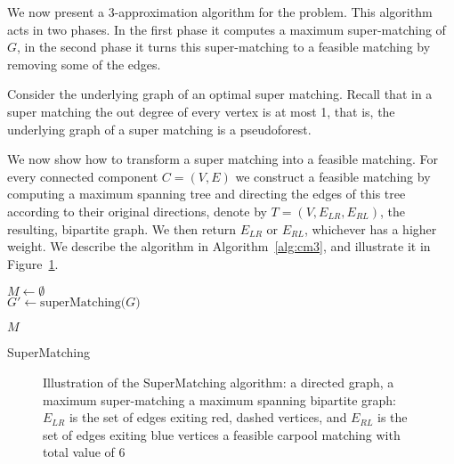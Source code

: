 \label{sub:cm}
We now present a 3-app\-roximation algorithm for the \textsc{\CARPOOL{}} problem.
This algorithm acts in two phases.
In the first phase it computes a maximum super-matching of $G$, 
in the second phase it turns this super-matching to a feasible matching
by removing some of the edges.

Consider the underlying graph of an optimal super matching.
Recall that in a super matching the out degree of every vertex is at most 1,
that is, the underlying graph of a super matching is a pseudoforest.

We now show how to transform a super matching into a feasible matching.
For every connected component $C = (V, E)$ we construct a feasible matching by
computing a maximum spanning tree and directing the edges of this tree according
to their original directions, denote by $T = (V, E_{LR}, E_{RL})$, the resulting, 
bipartite graph.
We then return $E_{LR}$ or $E_{RL}$,
whichever has a higher weight. 
We describe the algorithm in Algorithm~\ref{alg:cm3}, and illustrate it in Figure~\ref{fig:spanning-bipartite-graph}.   

\begin{algorithm}

$M \leftarrow \emptyset$								\\
$G' \leftarrow \text{superMatching($G$)}$				\\


\Return $M$
\caption{
\label{alg:cm3}
SuperMatching}
\end{algorithm}

\begin{figure}
\centering

\caption[]{
\label{fig:spanning-bipartite-graph}
Illustration of the SuperMatching algorithm:
 a directed graph, 
 a maximum super-matching  
 a maximum spanning bipartite graph:
$E_{LR}$ is the set of edges exiting red, dashed vertices, 
and $E_{RL}$ is the set of edges exiting blue vertices
 a feasible carpool matching with total value of 6   
}
\end{figure}

